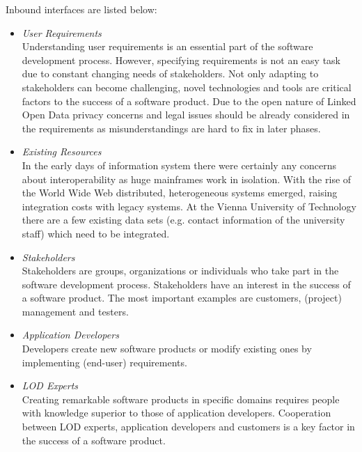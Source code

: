 \documentclass{article}
\begin{document}
Inbound interfaces are listed below:
\begin{itemize}
	\item \textit{User Requirements}~\\
	Understanding user requirements is an essential part of the software development process. However, specifying requirements is not an easy task due to constant changing needs of stakeholders. Not only adapting to stakeholders can become challenging, novel technologies and tools are critical factors to the success of a software product. Due to the open nature of Linked Open Data privacy concerns and legal issues should be already considered in the requirements as misunderstandings are hard to fix in later phases. 
	\item \textit{Existing Resources}~\\
	In the early days of information system there were certainly any concerns about interoperability as huge mainframes work in isolation. With the rise of the World Wide Web distributed, heterogeneous systems emerged, raising integration costs with legacy systems. At the Vienna University of Technology there are a few existing data sets (e.g. contact information of the university staff) which need to be integrated. 
	\item \textit{Stakeholders}~\\
	Stakeholders are groups, organizations or individuals who take part in the software development process. Stakeholders have an interest in the success of a software product. The most important examples are customers, (project) management and testers. 
	\item \textit{Application Developers}~\\
	Developers create new software products or modify existing ones by implementing (end-user) requirements. 
	\item \textit{LOD Experts}~\\
	Creating remarkable software products in specific domains requires people with knowledge superior to those of application developers. Cooperation between LOD experts, application developers and customers is a key factor in the success of a software product. 
\end{itemize}
\end{document}
